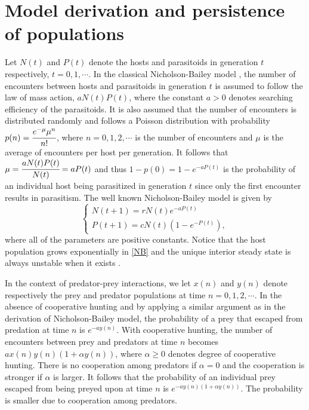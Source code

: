 \documentclass[11pt]{article}
\begin{document}
\section{Model derivation and persistence of populations}
\setcounter{equation}{0} Let $N(t)$ and $P(t)$ denote the hosts
and parasitoids in generation $t$ respectively, $t=0, 1, \cdots$.
In the classical Nicholson-Bailey model \cite{allen}, the number
of encounters between hosts  and parasitoids  in generation $t$ is
assumed to follow the law of  mass action,  $aN(t)P(t)$, where the
constant $a>0$ denotes searching efficiency of the parasitoids. It
is also assumed that the number of encounters is distributed
randomly and follows a Poisson distribution with probability
$p(n)=\cfrac{e^{-\mu}\mu^n}{n!}$, where $n=0, 1, 2, \cdots$ is the
number of encounters and $\mu$ is the average of encounters per
host per generation. It follows that
$\mu=\cfrac{aN(t)P(t)}{N(t)}=aP(t)$ and thus $1-p(0)=1-e^{-aP(t)}$
is the probability of an individual host being parasitized in
generation $t$ since only the first encounter results in
parasitism. The well known Nicholson-Bailey model is given by
\begin{equation}\label{NB}\left\{\begin{array}{ll}
N(t+1)= r N(t)\displaystyle e^{-aP(t)}\\[1ex]
P(t+1)=c N(t)\left(1-e^{-P(t)}\right),
\end{array}\right.
\end{equation}
where all of the parameters are positive constants. Notice that
the host  population grows exponentially in \eqref{NB} and the
unique interior steady state is always unstable when it exists
\cite{allen}.

In the context of predator-prey interactions, we let $x(n)$ and
$y(n)$ denote respectively the prey and predator populations at
time $n=0, 1, 2, \cdots$. In the absence of cooperative hunting
and by applying a similar argument as in the derivation of
Nicholson-Bailey model, the probability of a prey that escaped
from predation at time $n$ is $e^{-ay(n)}$. With cooperative
hunting, the number of encounters between prey and predators at
time $n$ becomes $ax(n)y(n)(1+\alpha y(n))$, where $\alpha\geq 0$
denotes degree of cooperative hunting. There is no cooperation
among  predators if $\alpha=0$ and the cooperation is stronger if
$\alpha$ is larger.  It follows that  the probability of an
individual prey escaped from being preyed upon at time $n$ is
$e^{-ay(n)(1+\alpha y(n))}$. The probability is smaller due to
cooperation among predators.
\end{document}
